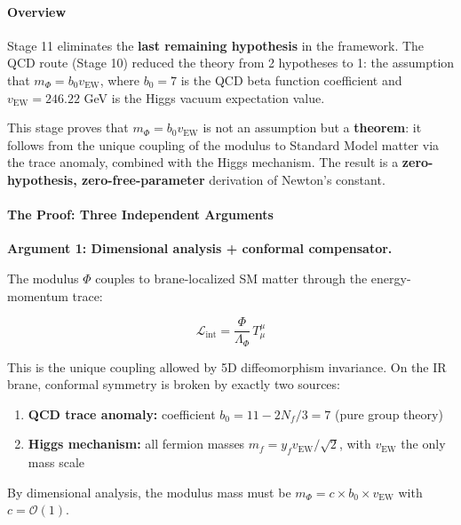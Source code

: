 \documentclass[
  11pt,
]{article}
\providecommand{\tightlist}{%
  \setlength{\itemsep}{0pt}\setlength{\parskip}{0pt}}
\begin{document}
\hypertarget{overview-10}{%
\paragraph{Overview}\label{overview-10}}

Stage 11 eliminates the \textbf{last remaining hypothesis} in the
framework. The QCD route (Stage 10) reduced the theory from 2 hypotheses
to 1: the assumption that \(m_\Phi = b_0 v_\text{EW}\), where
\(b_0 = 7\) is the QCD beta function coefficient and
\(v_\text{EW} = 246.22\) GeV is the Higgs vacuum expectation value.

This stage proves that \(m_\Phi = b_0 v_\text{EW}\) is not an assumption
but a \textbf{theorem}: it follows from the unique coupling of the
modulus to Standard Model matter via the trace anomaly, combined with
the Higgs mechanism. The result is a \textbf{zero-hypothesis,
zero-free-parameter} derivation of Newton's constant.

\bigskip

\hypertarget{the-proof-three-independent-arguments}{%
\paragraph{The Proof: Three Independent
Arguments}\label{the-proof-three-independent-arguments}}

\textbf{Argument 1: Dimensional analysis + conformal compensator.}

The modulus \(\Phi\) couples to brane-localized SM matter through the
energy-momentum trace:

\[\mathcal{L}_\text{int} = \frac{\Phi}{\Lambda_\Phi}\,T^\mu_\mu \tag{151}\]

This is the unique coupling allowed by 5D diffeomorphism invariance. On
the IR brane, conformal symmetry is broken by exactly two sources:

\begin{enumerate}
\def\labelenumi{\arabic{enumi}.}
\tightlist
\item
  \textbf{QCD trace anomaly:} coefficient \(b_0 = 11 - 2N_f/3 = 7\)
  (pure group theory)
\item
  \textbf{Higgs mechanism:} all fermion masses
  \(m_f = y_f v_\text{EW}/\sqrt{2}\), with \(v_\text{EW}\) the only mass
  scale
\end{enumerate}

By dimensional analysis, the modulus mass must be
\(m_\Phi = c \times b_0 \times v_\text{EW}\) with
\(c = \mathcal{O}(1)\).
\end{document}
